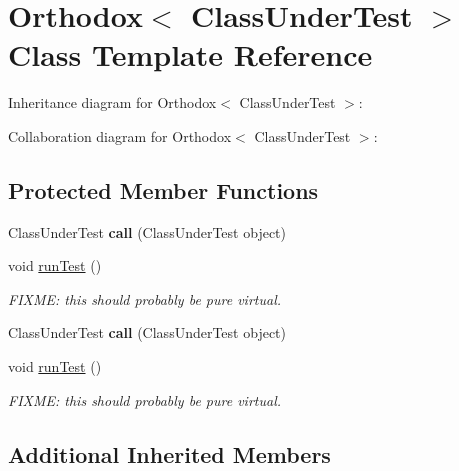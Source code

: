 \hypertarget{class_orthodox}{\section{Orthodox$<$ Class\+Under\+Test $>$ Class Template Reference}
\label{class_orthodox}
}


Inheritance diagram for Orthodox$<$ Class\+Under\+Test $>$\+:


Collaboration diagram for Orthodox$<$ Class\+Under\+Test $>$\+:
\subsection*{Protected Member Functions}
\begin{DoxyCompactItemize}
\item 
\hypertarget{class_orthodox_a08e9feb769578cb7a8b92c7c2c5d1874}{Class\+Under\+Test {\bfseries call} (Class\+Under\+Test object)}\label{class_orthodox_a08e9feb769578cb7a8b92c7c2c5d1874}

\item 
void \hyperlink{class_orthodox_aaeaafea272fdce3b5b2f33882cb33d8c}{run\+Test} ()
\begin{DoxyCompactList}\small\item\em F\+I\+X\+M\+E\+: this should probably be pure virtual. \end{DoxyCompactList}\item 
\hypertarget{class_orthodox_a08e9feb769578cb7a8b92c7c2c5d1874}{Class\+Under\+Test {\bfseries call} (Class\+Under\+Test object)}\label{class_orthodox_a08e9feb769578cb7a8b92c7c2c5d1874}

\item 
void \hyperlink{class_orthodox_aaeaafea272fdce3b5b2f33882cb33d8c}{run\+Test} ()
\begin{DoxyCompactList}\small\item\em F\+I\+X\+M\+E\+: this should probably be pure virtual. \end{DoxyCompactList}\end{DoxyCompactItemize}
\subsection*{Additional Inherited Members}


